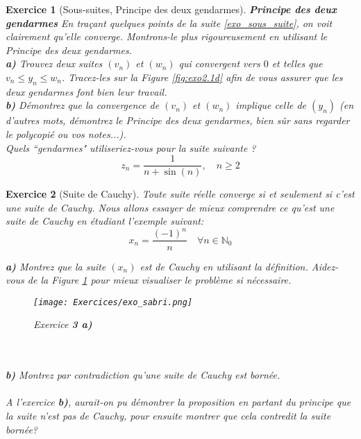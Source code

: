 \documentclass{article}
\newcommand{\Nn}{{\mathbb{N}}}
\theoremstyle{exercice}
\newtheorem{exercice}{Exercice}
\begin{document}
\begin{exercice}[Sous-suites, Principe des deux gendarmes]
\textbf{Principe des deux gendarmes}
En traçant quelques points de la suite \eqref{exo_sous_suite}, on voit clairement qu'elle converge. Montrons-le plus rigoureusement en utilisant le Principe des deux gendarmes.\\

\textbf{a)} Trouvez deux suites $(v_n)$ et $(w_n)$ qui convergent vers $0$ et telles que $v_n \leq y_n \leq w_n$. Tracez-les sur la Figure \ref{fig:exo2.1d} afin de vous assurer que les deux gendarmes font bien leur travail. \\

\textbf{b)} Démontrez que la convergence de $(v_n)$ et $(w_n)$ implique celle de $(y_n)$ (en d'autres mots, démontrez le Principe des deux gendarmes, bien sûr sans regarder le polycopié ou vos notes...). \\

\faLightbulbO \quad {} Quels ``gendarmes" utiliseriez-vous pour la suite suivante ?
\begin{equation}
    z_n = \frac{1}{n+\sin(n)}, \quad n \geq 2
\end{equation}
\end{exercice}
\begin{exercice}[Suite de Cauchy]
Toute suite réelle converge si et seulement si c'est une suite de Cauchy. Nous allons essayer de mieux comprendre ce qu'est une suite de Cauchy en étudiant l'exemple suivant:
\begin{equation}
    x_n = \frac{(-1)^n}{n} \quad \forall n\in \Nn_0
\end{equation}

\textbf{a)} Montrez que la suite $(x_n)$ est de Cauchy en utilisant la définition. Aidez-vous de la Figure \ref{fig:exo3a} pour mieux visualiser le problème si nécessaire.\\

\begin{figure}[H]
    \centering
    \texttt{[image: Exercices/exo\_sabri.png]}
    \caption{Exercice \textbf{3 a)}}
    \label{fig:exo3a}
\end{figure}\\ \\

\textbf{b)} Montrez par contradiction qu'une suite de Cauchy est bornée. \\
 \\

\faLightbulbO \quad {} A l'exercice \textbf{b)}, aurait-on pu démontrer la proposition en partant du principe que la suite n'est pas de Cauchy, pour ensuite montrer que cela contredit la suite bornée? \\


    
\end{exercice}
\end{document}

